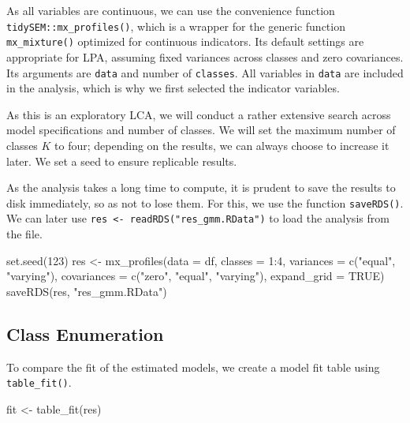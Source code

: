 \documentclass[
  man,floatsintext]{apa6}
\newenvironment{Shaded}{\begin{snugshade}}{\end{snugshade}}
\newcommand{\AttributeTok}[1]{\textcolor[rgb]{0.77,0.63,0.00}{#1}}
\newcommand{\ConstantTok}[1]{\textcolor[rgb]{0.00,0.00,0.00}{#1}}
\newcommand{\DecValTok}[1]{\textcolor[rgb]{0.00,0.00,0.81}{#1}}
\newcommand{\FunctionTok}[1]{\textcolor[rgb]{0.00,0.00,0.00}{#1}}
\newcommand{\NormalTok}[1]{#1}
\newcommand{\OtherTok}[1]{\textcolor[rgb]{0.56,0.35,0.01}{#1}}
\newcommand{\SpecialCharTok}[1]{\textcolor[rgb]{0.00,0.00,0.00}{#1}}
\newcommand{\StringTok}[1]{\textcolor[rgb]{0.31,0.60,0.02}{#1}}
\begin{document}
As all variables are continuous, we can use the convenience function
\texttt{tidySEM::mx\_profiles()},
which is a wrapper for the generic function \texttt{mx\_mixture()} optimized for continuous indicators.
Its default settings are appropriate for LPA, assuming fixed variances across classes and zero covariances.
Its arguments are \texttt{data} and number of \texttt{classes}.
All variables in \texttt{data} are included in the analysis,
which is why we first selected the indicator variables.

As this is an exploratory LCA,
we will conduct a rather extensive search across model specifications and number of classes.
We will set the maximum number of classes \(K\) to four; depending on the results, we can always choose to increase it later.
We set a seed to ensure replicable results.

As the analysis takes a long time to compute,
it is prudent to save the results to disk immediately, so as not to lose them.
For this, we use the function \texttt{saveRDS()}.
We can later use \texttt{res\ \textless{}-\ readRDS("res\_gmm.RData")} to load the analysis from the file.

\begin{Shaded}
\begin{Highlighting}[]
\FunctionTok{set.seed}\NormalTok{(}\DecValTok{123}\NormalTok{)}
\NormalTok{res }\OtherTok{\textless{}{-}} \FunctionTok{mx\_profiles}\NormalTok{(}\AttributeTok{data =}\NormalTok{ df, }\AttributeTok{classes =} \DecValTok{1}\SpecialCharTok{:}\DecValTok{4}\NormalTok{, }\AttributeTok{variances =} \FunctionTok{c}\NormalTok{(}\StringTok{"equal"}\NormalTok{,}
    \StringTok{"varying"}\NormalTok{), }\AttributeTok{covariances =} \FunctionTok{c}\NormalTok{(}\StringTok{"zero"}\NormalTok{, }\StringTok{"equal"}\NormalTok{, }\StringTok{"varying"}\NormalTok{),}
    \AttributeTok{expand\_grid =} \ConstantTok{TRUE}\NormalTok{)}
\FunctionTok{saveRDS}\NormalTok{(res, }\StringTok{"res\_gmm.RData"}\NormalTok{)}
\end{Highlighting}
\end{Shaded}

\hypertarget{class-enumeration}{%
\subsection{Class Enumeration}\label{class-enumeration}}

To compare the fit of the estimated models,
we create a model fit table using
\texttt{table\_fit()}.

\begin{Shaded}
\begin{Highlighting}[]
\NormalTok{fit }\OtherTok{\textless{}{-}} \FunctionTok{table\_fit}\NormalTok{(res)}
\end{Highlighting}
\end{Shaded}
\end{document}
